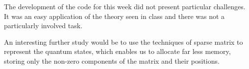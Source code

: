The development of the code for this week did not present particular challenges. 
It was an easy application of the theory seen in class and there was not a particularly
involved task. 

An interesting further study would be to use the techniques of sparse matrix to represent the quantum states,
which enables us to allocate far less memory, storing only the non-zero components of the matrix and their 
positions.